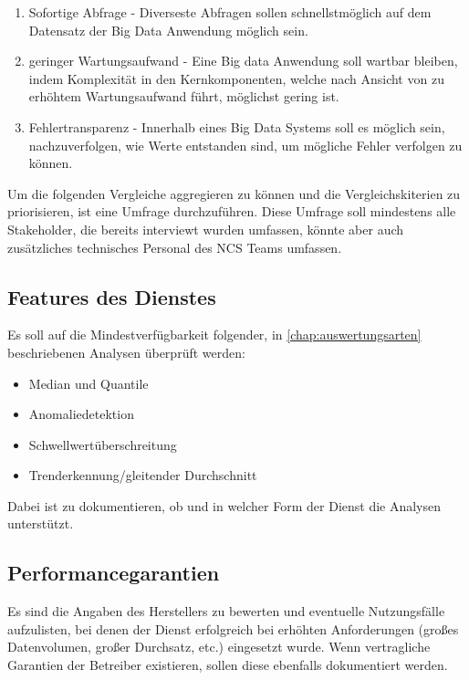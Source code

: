 \begin{enumerate}
\item Sofortige Abfrage  - 
Diverseste Abfragen sollen schnellstmöglich auf dem Datensatz der Big Data Anwendung möglich sein.

\item geringer Wartungsaufwand  - 
Eine Big data Anwendung soll wartbar bleiben, indem Komplexität in den Kernkomponenten, welche nach Ansicht von \citeauthor{Marz.2015} zu erhöhtem Wartungsaufwand führt, möglichst gering ist.

\item Fehlertransparenz  - 
Innerhalb eines Big Data Systems soll es möglich sein, nachzuverfolgen, wie Werte entstanden sind, um mögliche Fehler verfolgen zu können.
\end{enumerate}

Um die folgenden Vergleiche aggregieren zu können und die Vergleichskiterien zu priorisieren, ist eine Umfrage durchzuführen. Diese Umfrage soll mindestens alle Stakeholder, die bereits interviewt wurden umfassen, könnte aber auch zusätzliches technisches Personal des \ac{NCS} Teams umfassen. 


\subsection{Features des Dienstes}
Es soll auf die Mindestverfügbarkeit folgender, in \autoref{chap:auswertungsarten} beschriebenen Analysen überprüft werden:

\begin{itemize}
\item Median und Quantile
\item Anomaliedetektion
\item Schwellwertüberschreitung
\item Trenderkennung/gleitender Durchschnitt
\end{itemize}

Dabei ist zu dokumentieren, ob und in welcher Form der Dienst die Analysen unterstützt.



\subsection{Performancegarantien}
Es sind die Angaben des Herstellers zu bewerten und eventuelle Nutzungsfälle aufzulisten, bei denen der Dienst erfolgreich bei erhöhten Anforderungen (großes Datenvolumen, großer Durchsatz, etc.) eingesetzt wurde. Wenn vertragliche Garantien der Betreiber existieren, sollen diese ebenfalls dokumentiert werden.

